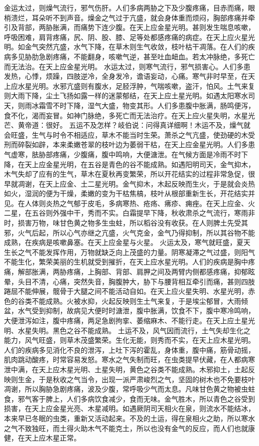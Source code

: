 \documentclass[12pt,UTF8]{ctexbook}
\begin{document}
金运太过，则燥气流行，邪气伤肝。人们多病两胁之下及少腹疼痛，目赤而痛，眼梢溃烂，耳朵听不到声音。燥金之气过于亢盛，就会身体重而烦闷，胸部疼痛并牵引及背部，两胁胀满，而痛势下连少腹。在天上应金星光明。甚则发生喘息咳嗽，呼吸困难，肩背疼痛，尻、阴、股、膝、足等处都感疼痛的病症。在天上应火星光明。如金气突然亢盛，水气下降，在草木则生气收敛，枝叶枯干凋落。在人们的疾病多见胁肋急剧疼痛，不能翻身，咳嗽气逆，甚至吐血衄血。若太冲脉绝，多死亡而无法治。在天上应金星光明。
水运太过，则寒气流行，邪气损害心。人们多患发热，心悸，烦躁，四肢逆冷，全身发冷，谵语妄动，心痛。寒气非时早至，在天上应水星光明。水邪亢盛则有腹水，足胫浮肿，气喘咳嗽，盗汗，怕风。土气来复则大雨下降，尘土飞扬如露一样的迷蒙郁结，在天上应土星光明。如遇太阳寒水司天，则雨冰霜雪不时下降，湿气大盛，物变其形。人们多患腹中胀满，肠鸣便泻，食不化，渴而妄冒。如神门脉绝，多死亡而无法治疗。在天上应火星失明，水星光芒、黄帝道：很好。
五运不及怎样？岐伯说：问得真详细啊！木运不及，燥气就会旺盛，生气与时令不相适应，草木不能当时生荣。萧杀之气亢盛，使劲硬的木受刑而碎裂如辟，本来柔嫩苍翠的枝叶边为萎弱干枯，在天上应金星光明。人们多患气虚寒，胠胁部疼痛，少腹痛，腹中鸣响，大便溏泄。在气候方面是冷雨不时下降，在天上应金星光明，在五谷是青色的谷不能成熟。如遇阳明司天，金气抑木，木气失却了应有的生气，草木在夏秋再变繁荣，所以开花结实的过程非常急促，很早就凋谢，在天上应金、土二星光明。金气抑木，木起反映而生火，于是就会炎热如火，湿润的便为干燥，柔嫩的变为干枯焦槁，枝叶从根部重新生长，开花结实并见。在人体则炎热之气郁于皮毛，多病寒热、疮疡、疿疹、痈痤。在天上应金、火二星，在五谷则外强中干，秀而不实。白霜提早下降，秋收肃杀之气流行，寒雨非时，损害万物，味甘色黄之物多生虫蛀，所以稻谷没有收获。在人则脾土先受其邪，火气后起，所以心气亦继之亢盛，火气克金，金气乃得抑制，所以其谷物不能成熟，在疾病是咳嗽鼻塞。在天上应金星与火星。
火运太及，寒气就旺盛，夏天生长之气不能发挥作用，万物就缺乏向上茂盛的力量。阴寒凝滞之气过盛，则阳气不能生化，繁荣美丽的生机就受到摧折，在天上应水星光明。人们的疾病是胸中疼痛，解部胀满，两胁疼痛，上胸部、背部、肩胛之间及两臂内侧都感疼痛，抑郁眩晕，头目不清，心痛，突然失音，胸腹肿大，胁下与腰背相互牵引而痛，甚则四肢踡屈不能伸展，髋骨于大腿之间不能活动自如。在天上应火星失明、水星光明，赤色的谷类不能成熟。火被水抑，火起反映则生土气来复，于是埃尘郁冒，大雨倾盆，水气受到抑制，故病见大便时时溏泄，腹中胀满，饮食不下，腹中寒冷鸣响，大便泄泻如注，腹中疼痛，两足急剧拘挛、萎缩麻木、不能行走。在天上应土星光明、水星失明。黑色之谷不能成熟。
土运不及，风气因而流行，土气失却生化之能力，风气旺盛，则草木茂盛繁荣。生化无能，则秀而不实，在天上应木星光明。人们的疾病多见消化不良的泄泻，上吐下泻的霍乱，身体重，腹中痛，筋骨动摇，肌肉跳动酸疼，时常容易发怒。寒水之气失制而旺，在虫类提早伏藏，在人都病寒泄中满，在天上应木星光明、土星失明，黄色之谷类不能成熟。木邪抑土，土起反映则生金，于是秋收之气当令，出现一派严肃峻烈之气，坚固的树木也不免要枝叶凋谢，所以胸胁急剧疼痛，波及少腹，常呼吸少气而太息。凡味甘色黄之物被虫蛀食，邪气客于脾上，人们多病饮食减少，食而无味。金气胜木，所以青色之谷受到损害，在天上应金星光亮、木星减明。如遇厥阴司天相火在泉，则流水不能结冰，本来早已冬眠的虫类，重新又活动起来。不及的土运，得在泉相火之助，所以寒水之气不致独旺，而土得火助木气不能克土，所以也没有金气的反应，而人们也就康健，在天上应木星正常。
\end{document}
